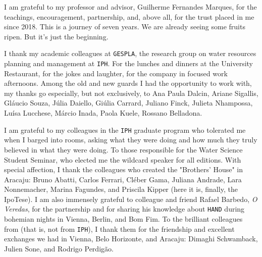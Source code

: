 \documentclass[./main_en.tex]{subfiles}
\begin{document}
\doublespacing %
\large

\newpage
\renewcommand{\headrulewidth}{0pt}
\thispagestyle{fancy}
\fancyhf{} %
\fancyfoot{} %
\fancyfoot[C]{\thepage}

\begin{center}
    \vspace{5mm}
\end{center}
\singlespacing
\normalsize

\setlength{\parskip}{\myparskip}

\par I am grateful to my professor and advisor, Guilherme Fernandes Marques, for the teachings, encouragement, partnership, and, above all, for the trust placed in me since 2018. This is a journey of seven years. We are already seeing some fruits ripen. But it’s just the beginning.

\par I thank my academic colleagues at \texttt{GESPLA}, the research group on water resources planning and management at \texttt{IPH}. For the lunches and dinners at the University Restaurant, for the jokes and laughter, for the company in focused work afternoons. Among the old and new guards I had the opportunity to work with, my thanks go especially, but not exclusively, to Ana Paula Dalcin, Ariane Sigallis, Gláucio Souza, Júlia Daiello, Giúlia Carrard, Juliano Finck, Julieta Nhampossa, Luísa Lucchese, Márcio Inada, Paola Kuele, Rossano Belladona.

\par I am grateful to my colleagues in the \texttt{IPH} graduate program who tolerated me when I barged into rooms, asking what they were doing and how much they truly believed in what they were doing. To those responsible for the Water Science Student Seminar, who elected me the wildcard speaker for all editions. With special affection, I thank the colleagues who created the "Brothers' House" in Aracaju: Bruno Abatti, Carlos Ferrari, Cléber Gama, Juliana Andrade, Lara Nonnemacher, Marina Fagundes, and Priscila Kipper (here it is, finally, the IpoTese). I am also immensely grateful to colleague and friend Rafael Barbedo, \textit{O Veredas}, for the partnership and for sharing his knowledge about \texttt{HAND} during bohemian nights in Vienna, Berlin, and Bom Fim. To the brilliant colleagues from  (that is, not from \texttt{IPH}), I thank them for the friendship and excellent exchanges we had in Vienna, Belo Horizonte, and Aracaju: Dimaghi Schwamback, Julien Sone, and Rodrigo Perdigão.
\end{document}
